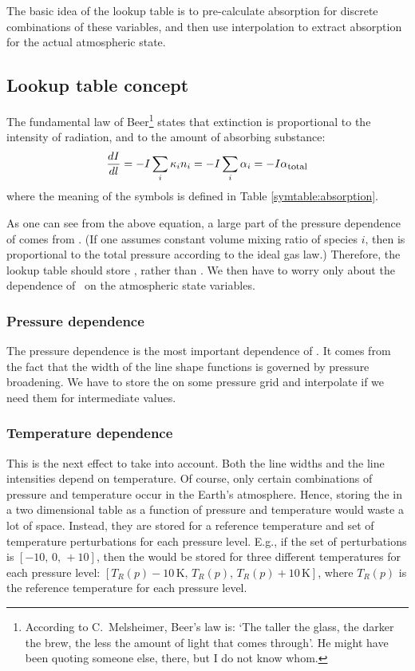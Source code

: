 The basic idea of the lookup table is to pre-calculate absorption for
discrete combinations of these variables, and then use interpolation
to extract absorption for the actual atmospheric state.

\subsection{Lookup table concept}

The fundamental law of Beer\footnote{According to C.\ Melsheimer,
  Beer's law is: `The taller the glass, the darker the brew, the less
  the amount of light that comes through'. He might have been quoting
  someone else, there, but I do not know whom.} states that extinction
is proportional to the intensity of radiation, and to the amount of
absorbing substance:
\begin{equation}
  \label{eq:lookup:beer}
  \frac{d I}{d l}
  =
  - I \sum_i {\kappa}_{i} {n}_{i}
  =
  - I \sum_i {\alpha}_{i}
  =
  - I {\alpha}_{\mbox{\footnotesize total}}
\end{equation}
where the meaning of the symbols is defined in Table
\ref{symtable:absorption}. 

As one can see from the above equation, a large part of the pressure
dependence of  comes from . (If one assumes
constant volume mixing ratio of species $i$, then  is
proportional to the total pressure according to the ideal gas law.) 
Therefore, the lookup table should store \AbsXsec, rather than
\AbsCoef. We then have to worry only about the dependence of \AbsXsec\
on the atmospheric state variables.

\subsubsection{Pressure dependence}

The pressure dependence is the most important dependence of
\AbsXsec. It comes from the fact that the width of the line shape
functions is governed by pressure broadening. We have to store the
\aAbsXsec{i} on some pressure grid and interpolate if we need them for
intermediate values.

\subsubsection{Temperature dependence}

This is the next effect to take into account. Both the line widths and
the line intensities depend on temperature. Of course, only certain
combinations of pressure and temperature occur in the Earth's
atmosphere. Hence, storing the  in a two dimensional table
as a function of pressure and temperature would waste a lot of space.
Instead, they are stored for a reference temperature and set of
temperature perturbations for each pressure level. E.g., if the set of
perturbations is $[-10,\, 0,\, +10]$, then the \aAbsXsec{i} would be stored
for three different temperatures for each pressure level:
$[T_R(p)-10\,\mbox{K},\, T_R(p),\, T_R(p)+10\,\mbox{K}]$, where
$T_R(p)$ is the reference temperature for each pressure level.

